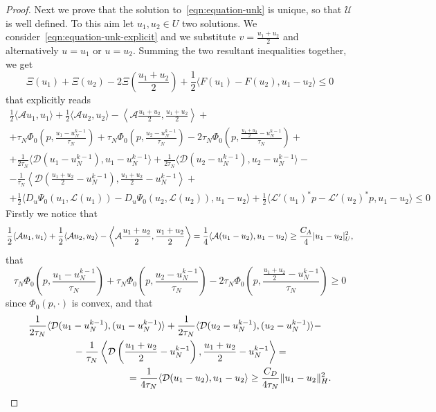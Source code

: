 \documentclass[a4paper,10pt,twoside]{amsbook}
\numberwithin{section}{chapter}
\numberwithin{equation}{chapter}
\theoremstyle{definition}
\DeclarePairedDelimiter{\norm}{\lVert}{\rVert}
\DeclarePairedDelimiter{\dual}{\langle}{\rangle}
\begin{document}
\begin{proof}
Next we prove that the solution to~\eqref{eqn:equation-unk} is unique, so that $\mathcal{U}$ is well defined. To this aim let $u_1,u_2\in U$ two solutions. We consider~\eqref{eqn:equation-unk-explicit} and we substitute $v=\frac{u_1+u_2}{2}$ and alternatively $u=u_1$ or $u=u_2$. Summing the two resultant inequalities together, we get
\begin{equation}
\label{eqn:estimates-unicity}
\Xi(u_1)+\Xi(u_2)-2\Xi\left(\frac{u_1+u_2}{2}\right)+\frac{1}{2}\langle F(u_1)-F(u_2),u_1-u_2\rangle\le0
\end{equation}
that explicitly reads
\[
\begin{multlined}
\frac{1}{2}\langle \mathcal{A}u_1,u_1\rangle+\frac{1}{2}\langle \mathcal{A}u_2,u_2\rangle-\left\langle \mathcal{A}\frac{u_1+u_2}{2},\frac{u_1+u_2}{2}\right\rangle+\\
+\tau_N\Phi_0\left(p,\frac{u_1-u_N^{k-1}}{\tau_N}\right)+\tau_N\Phi_0\left(p,\frac{u_2-u_N^{k-1}}{\tau_N}\right)-2\tau_N\Phi_0\left(p,\frac{\frac{u_1+u_2}{2}-u_N^{k-1}}{\tau_N}\right)+\\
+\frac{1}{2\tau_N}\langle \mathcal{D}(u_1-u_N^{k-1}),u_1-u_N^{k-1}\rangle+\frac{1}{2\tau_N}\langle \mathcal{D}(u_2-u_N^{k-1}),u_2-u_N^{k-1}\rangle-\\
-\frac{1}{\tau_N}\left\langle \mathcal{D}\left(\frac{u_1+u_2}{2}-u_N^{k-1}\right),\frac{u_1+u_2}{2}-u_N^{k-1}\right\rangle+\\
+\frac{1}{2}\langle D_u\Psi_0(u_1,\mathcal{L}(u_1))-D_u\Psi_0(u_2,\mathcal{L}(u_2)),u_1-u_2\rangle+\frac{1}{2}\langle\mathcal{L}'(u_1)^*p-\mathcal{L}'(u_2)^*p,u_1-u_2\rangle\le0
\end{multlined}
\]
Firstly we notice that
\[
\frac{1}{2}\dual{\mathcal{A}u_1,u_1}+\frac{1}{2}\dual{\mathcal{A}u_2,u_2}-\left\langle\mathcal{A}\frac{u_1+u_2}{2},\frac{u_1+u_2}{2}\right\rangle=\frac{1}{4}\dual{\mathcal{A}(u_1-u_2),u_1-u_2}\ge\frac{C_A}{4}|u_1-u_2|_U^2,
\]
that
\[
\tau_N\Phi_0\left(p,\frac{u_1-u_N^{k-1}}{\tau_N}\right)+\tau_N\Phi_0\left(p,\frac{u_2-u_N^{k-1}}{\tau_N}\right)-2\tau_N\Phi_0\left(p,\frac{\frac{u_1+u_2}{2}-u_N^{k-1}}{\tau_N}\right)\ge0
\]
since $\Phi_0(p,\cdot)$ is convex, and that
\[
\begin{multlined}
\frac{1}{2\tau_N}\dual{\mathcal{D}(u_1-u_N^{k-1}),(u_1-u_N^{k-1})}+\frac{1}{2\tau_N}\dual{\mathcal{D}(u_2-u_N^{k-1}),(u_2-u_N^{k-1})}-\\
-\frac{1}{\tau_N}\left\langle\mathcal{D}\left(\frac{u_1+u_2}{2}-u_N^{k-1}\right),\frac{u_1+u_2}{2}-u_N^{k-1}\right\rangle=\\
=\frac{1}{4\tau_N}\dual{\mathcal{D}(u_1-u_2),u_1-u_2}\ge\frac{C_D}{4\tau_N}\norm{u_1-u_2}_H^2.

\end{multlined}\]
\end{proof}
\end{document}
